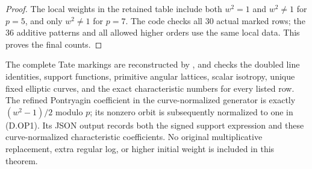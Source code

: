 \begin{proof}
The local weights in the retained table include both
$w^2=1$ and $w^2\ne1$ for $p=5$, and only $w^2\ne1$
for $p=7$. The code checks all $30$ actual marked rows;
the $36$ additive patterns and all allowed higher orders
use the same local data. This proves the final counts.
\end{proof}

The complete Tate markings are reconstructed by
, and
 checks the doubled
line identities, support functions, primitive angular
lattices, scalar isotropy, unique fixed elliptic curves,
and the exact characteristic numbers for every listed row.
The refined Pontryagin coefficient in the curve-normalized
generator is exactly $(w^2-1)/2$ modulo $p$; its nonzero
orbit is subsequently normalized to one in (D.OP1).
Its JSON output records both the signed support expression
and these curve-normalized characteristic coefficients.
No original
multiplicative replacement, extra regular log, or
higher initial weight is included in this theorem.

